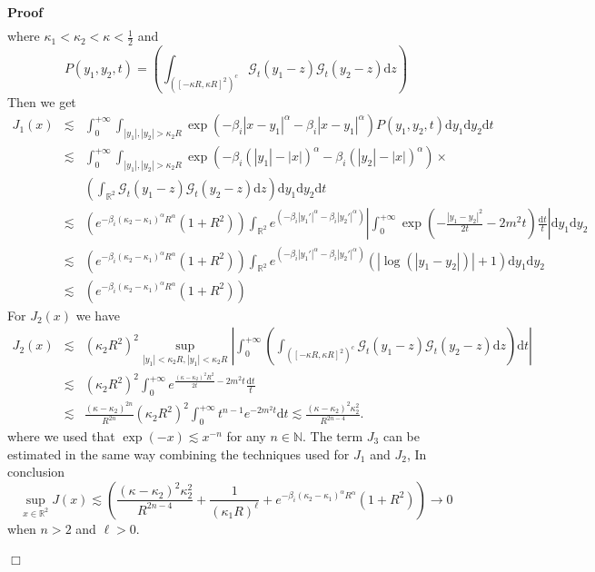 \documentclass{article}
\newcommand{\mathd}{\mathrm{d}}
\newenvironment{proof}{\noindent\textbf{Proof\ }}{\hspace*{\fill}$\Box$\medskip}
\begin{document}
\begin{proof}
\begin{eqnarray}
  \end{eqnarray}
  where $\kappa_1 < \kappa_2 < \kappa < \frac{1}{2}$ and
  \[ P (y_1, y_2, t) = \left( \int_{([- \kappa R, \kappa R]^2)^c}
     \mathcal{G}_t (y_1 - z) \mathcal{G}_t (y_2 - z) \mathd z \right) \]
  Then we get
  \begin{eqnarray}
    J_1 (x) & \lesssim & \int_0^{+ \infty} \int_{| y_1 |, | y_2 | > \kappa_2
    R} \exp (- \beta_i | x - y_1 |^{\alpha} - \beta_i | x - y_1 |^{\alpha}) P
    (y_1, y_2, t) \mathd y_1 \mathd y_2 \mathd t \nonumber\\
    & \lesssim & \int_0^{+ \infty} \int_{| y_1 |, | y_2 | > \kappa_2 R} \exp
    (- \beta_i (| y_1 | - | x |)^{\alpha} - \beta_i (| y_2 | - | x
    |)^{\alpha}) \times \nonumber\\
    &  & \left( \int_{\mathbb{R}^2} \mathcal{G}_t (y_1 - z) \mathcal{G}_t
    (y_2 - z) \mathd z \right) \mathd y_1 \mathd y_2 \mathd t \nonumber\\
    & \lesssim & (e^{- \beta_i (\kappa_2 - \kappa_1)^{\alpha} R^{\alpha}} (1
    + R^2)) \int_{\mathbb{R}^2} e^{(- \beta_i | y_1' |^{\alpha} - \beta_i |
    y_2' |^{\alpha})} \left| \int_0^{+ \infty} \exp \left( - \frac{| y_1 - y_2
    |^2}{2 t} - 2 m^2 t \right) \frac{\mathd t}{t} \right| \mathd y_1 \mathd
    y_2 \nonumber\\
    & \lesssim & (e^{- \beta_i (\kappa_2 - \kappa_1)^{\alpha} R^{\alpha}} (1
    + R^2)) \int_{\mathbb{R}^2} e^{(- \beta_i | y_1' |^{\alpha} - \beta_i |
    y_2' |^{\alpha})} (| \log (| y_1 - y_2 |) | + 1) \mathd y_1 \mathd y_2
    \nonumber\\
    & \lesssim & (e^{- \beta_i (\kappa_2 - \kappa_1)^{\alpha} R^{\alpha}} (1
    + R^2)) \nonumber
  \end{eqnarray}
  For $J_2 (x)$ we have
  \begin{eqnarray}
    J_2 (x) & \lesssim & (\kappa_2 R^2)^2 \sup_{| y_1 | < \kappa_2 R, | y_1 |
    < \kappa_2 R} \left| \int_0^{+ \infty} \left( \int_{([- \kappa R, \kappa
    R]^2)^c} \mathcal{G}_t (y_1 - z) \mathcal{G}_t (y_2 - z) \mathd z \right)
    \mathd t \right| \nonumber\\
    & \lesssim & (\kappa_2 R^2)^2 \int_0^{+ \infty} e^{\frac{(\kappa -
    \kappa_2)^2 R^2}{2 t} - 2 m^2 t} \frac{\mathd t}{t} \nonumber\\
    & \lesssim & \frac{(\kappa - \kappa_2)^{2 n}}{R^{2 n}} (\kappa_2 R^2)^2
    \int_0^{+ \infty} t^{n - 1} e^{- 2 m^2 t} \mathd t \lesssim \frac{(\kappa
    - \kappa_2)^2 \kappa_2^2}{R^{2 n - 4}} . \nonumber
  \end{eqnarray}
  where we used that $\exp (- x) \lesssim x^{- n}$ for any $n \in \mathbb{N}$.
  The term $J_3$ can be estimated in the same way combining the techniques
  used for $J_1$ and $J_2$, In conclusion
  \[ \sup_{x \in \mathbb{R}^2} J (x) \lesssim \left( \frac{(\kappa -
     \kappa_2)^2 \kappa_2^2}{R^{2 n - 4}} + \frac{1}{(\kappa_1 R)^{\ell}} +
     e^{- \beta_i (\kappa_2 - \kappa_1)^{\alpha} R^{\alpha}} (1 + R^2) \right)
     \rightarrow 0 \]
  when $n > 2$ and $\ell > 0$.
  

\end{proof}
\end{document}

